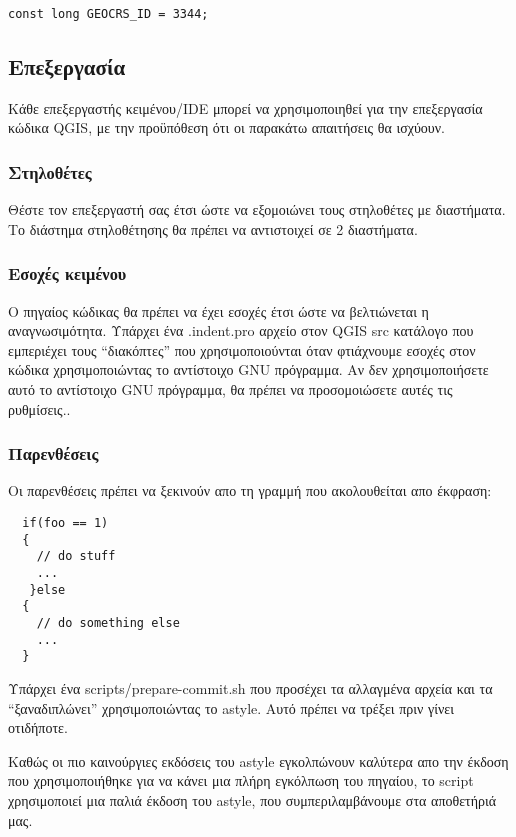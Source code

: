 \begin{verbatim}
const long GEOCRS_ID = 3344;
\end{verbatim}

\hypertarget{toc17}{}
\subsection{Επεξεργασία}
Κάθε επεξεργαστής κειμένου/IDE μπορεί να χρησιμοποιηθεί για την επεξεργασία κώδικα QGIS, με την προϋπόθεση ότι οι παρακάτω απαιτήσεις θα ισχύουν.

\hypertarget{toc18}{}
\subsubsection{Στηλοθέτες}
Θέστε τον επεξεργαστή σας έτσι ώστε να εξομοιώνει τους στηλοθέτες με διαστήματα. Το διάστημα στηλοθέτησης θα πρέπει να αντιστοιχεί σε 2 διαστήματα.

\hypertarget{toc19}{}
\subsubsection{Εσοχές κειμένου}
Ο πηγαίος κώδικας θα πρέπει να έχει εσοχές έτσι ώστε να βελτιώνεται η αναγνωσιμότητα. Υπάρχει ένα .indent.pro αρχείο στον QGIS src κατάλογο που εμπεριέχει τους “διακόπτες” που χρησιμοποιούνται όταν φτιάχνουμε εσοχές στον κώδικα χρησιμοποιώντας το αντίστοιχο GNU πρόγραμμα. Αν δεν χρησιμοποιήσετε αυτό το αντίστοιχο GNU πρόγραμμα, θα πρέπει να προσομοιώσετε αυτές τις ρυθμίσεις..

\hypertarget{toc20}{}
\subsubsection{Παρενθέσεις}
Οι παρενθέσεις πρέπει να ξεκινούν απο τη γραμμή που ακολουθείται απο έκφραση:

\begin{verbatim}
  if(foo == 1)
  {
    // do stuff
    ...
   }else
  {
    // do something else
    ...
  }
\end{verbatim}

Υπάρχει ένα  scripts/prepare-commit.sh που προσέχει τα αλλαγμένα αρχεία και τα “ξαναδιπλώνει” χρησιμοποιώντας το astyle. Αυτό πρέπει να τρέξει πριν γίνει οτιδήποτε.

Καθώς οι πιο καινούργιες εκδόσεις του astyle εγκολπώνουν καλύτερα απο την έκδοση που χρησιμοποιήθηκε για να κάνει μια πλήρη εγκόλπωση του πηγαίου, το script χρησιμοποιεί μια παλιά έκδοση του astyle, που συμπεριλαμβάνουμε στα αποθετήριά μας.

